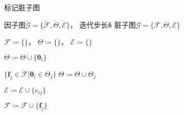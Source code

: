 \begin{algorithm}
\caption{标记脏子图}
\begin{algorithmic}
    \Require 因子图$\check{\mathcal{G}}=\{\check{\mathcal{F}},\check{\Theta},\check{\mathcal{E}}\}$，
             迭代步长$\bm{\delta}$
    \Ensure 脏子图$\mathcal{G}=\{\mathcal{F},\Theta,\mathcal{E}\}$

    \State $\mathcal{F}\coloneqq\{\}$，
           $\Theta\coloneqq\{\}$，
           $\mathcal{E}\coloneqq\{\}$

        \State $\Theta\coloneqq\Theta\cup\{\bm{\theta}_i\}$

        \ForAll
        {$\{
                \bm{f}_j\in\check{\mathcal{F}} |
                \bm{\theta}_i\in\Theta_j
        \}$}
            \State $\Theta\coloneqq\Theta\cup\Theta_j$

            \State $\mathcal{E} \coloneqq \mathcal{E} \cup \{e_{ij}\}$

            \State $\mathcal{F} \coloneqq \mathcal{F} \cup \{\bm{f}_j\}$
        \EndFor
    \EndFor
\end{algorithmic}
\label{alg:mark_dirty}
\end{algorithm}
